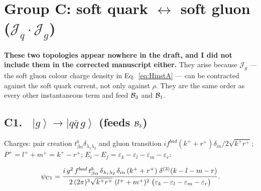 \documentclass[11pt]{article}
\newcommand{\ibar}[2]{\draw[line width=1.1pt] (#1-0.13,#2) -- (#1+0.13,#2);}
\newcommand{\eps}{\varepsilon}
\newcommand{\dthree}{\delta^{(3)}}
\newcommand{\ket}[1]{\left|#1\right\rangle}
\newcommand{\qk}[3]{q^{#1}_{#2}(#3)}
\newcommand{\aqk}[3]{\bar q^{#1}_{#2}(#3)}
\newcommand{\gl}[3]{g^{#1}_{#2}(#3)}
\newcommand{\Jc}{\mathcal{J}}
\begin{document}
\section{Group C: soft quark $\leftrightarrow$ soft gluon ($\Jc_{q}\cdot\Jc_{g}$)}

\begin{newfind}
\textbf{These two topologies appear nowhere in the draft, and I did not include them in the
corrected manuscript either.} They arise because $\Jc_{g}$ --- the soft gluon colour charge
density in Eq.~\eqref{eq:HinstA} --- can be contracted against the soft quark current, not only
against $\rho$. They are the same order as every other instantaneous term and feed $\mathcal{B}_{3}$ and
$\mathcal{B}_{1}$.
\end{newfind}

\subsection*{C1. \ $\ket{g}\to\ket{q\bar q\,g}$ \quad (feeds $\mathcal{B}_{3}$)}
\begin{center}
\end{center}
Charges: pair creation $t^{b}_{\beta\alpha}\delta_{\lambda_{1}\lambda_{2}}$ and gluon transition
$if^{bad}(k^{+}+r^{+})\delta_{in}/2\sqrt{k^{+}r^{+}}$; $P^{+}=l^{+}+m^{+}=k^{+}-r^{+}$;
$E_{i}-E_{f}=\eps_{k}-\eps_{l}-\eps_{m}-\eps_{r}$:
\begin{res}
\begin{equation}
\psi_{\rm C1}=\frac{i\,g^{2}\,f^{bad}\,t^{b}_{\beta\alpha}\,
\delta_{\lambda_{1}\lambda_{2}}\,\delta_{in}\,(k^{+}+r^{+})\;\dthree(k-l-m-r)}
{2\,(2\pi)^{3}\sqrt{k^{+}r^{+}}\;(l^{+}+m^{+})^{2}\;
\big(\eps_{k}-\eps_{l}-\eps_{m}-\eps_{r}\big)} .
\label{eq:C1}
\end{equation}
\end{res}
\end{document}
